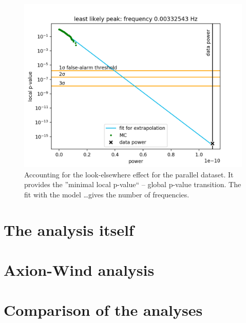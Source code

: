 \begin{figure}
  \centering \includegraphics[width=\linewidth]{gfx/axions/P_best_signal_candidate.png}
  \caption{Accounting for the look-elsewhere effect for the parallel dataset. It provides the ''minimal local p-value`` -- global p-value transition. The fit with the model \dots gives the number of frequencies.}
  \label{fig:P_best_signal_candidate}
\end{figure}







\section{The analysis itself}

\section{Axion-Wind analysis}

\section{Comparison of the analyses}
